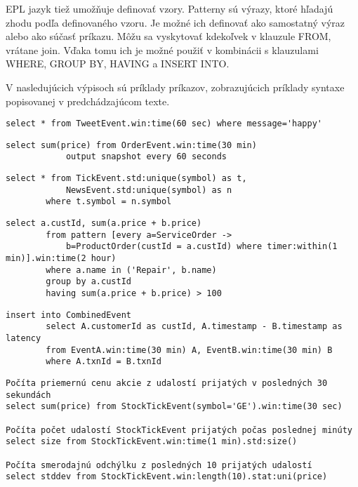 		EPL jazyk tiež umožňuje definovať vzory. Patterny sú výrazy, ktoré hľadajú zhodu podľa definovaného vzoru. Je možné ich definovať ako samostatný výraz alebo ako súčasť príkazu. Môžu sa vyskytovať kdekoľvek v klauzule FROM, vrátane join. Vďaka tomu ich je možné použiť v kombinácii s klauzulami WHERE, GROUP BY, HAVING a INSERT INTO.
		
		V nasledujúcich výpisoch sú príklady príkazov, zobrazujúcich príklady syntaxe popisovanej v predchádzajúcom texte.
		\begin{lstlisting}[label=lst:epl-simple,caption=Jednoduchý EPL príkaz]
		select * from TweetEvent.win:time(60 sec) where message='happy'
		\end{lstlisting}
		
		\begin{lstlisting}[label=lst:output-example,caption=EPL príkaz s výstupom každých 60 sekúnd]
		select sum(price) from OrderEvent.win:time(30 min)
			output snapshot every 60 seconds
		\end{lstlisting}

		\begin{lstlisting}[label=lst:epl-join,caption=Jednoduchý EPL príkaz použitím join]
		select * from TickEvent.std:unique(symbol) as t,
			NewsEvent.std:unique(symbol) as n
		where t.symbol = n.symbol
		\end{lstlisting}

		\begin{lstlisting}[label=lst:epl-pattern,caption=EPL príkaz s použitím vzoru \cite{web:esper-doc}]
		select a.custId, sum(a.price + b.price)
		from pattern [every a=ServiceOrder -> 
			b=ProductOrder(custId = a.custId) where timer:within(1 min)].win:time(2 hour) 
		where a.name in ('Repair', b.name)
		group by a.custId
		having sum(a.price + b.price) > 100
		\end{lstlisting}
		
		\begin{lstlisting}[label=lst:insert-into,caption=Príklad použitia klauzuly INSERT INTO \cite{web:esper-doc}]
		insert into CombinedEvent
		select A.customerId as custId, A.timestamp - B.timestamp as latency
		from EventA.win:time(30 min) A, EventB.win:time(30 min) B
		where A.txnId = B.txnId
		\end{lstlisting}
		
		\begin{lstlisting}[label=lst:views,caption=Príklady použitia dátových náhľadov]
Počíta priemernú cenu akcie z udalostí prijatých v posledných 30 sekundách
select sum(price) from StockTickEvent(symbol='GE').win:time(30 sec)

Počíta počet udalostí StockTickEvent prijatých počas poslednej minúty
select size from StockTickEvent.win:time(1 min).std:size()

Počíta smerodajnú odchýlku z posledných 10 prijatých udalostí
select stddev from StockTickEvent.win:length(10).stat:uni(price)
		\end{lstlisting}
		
